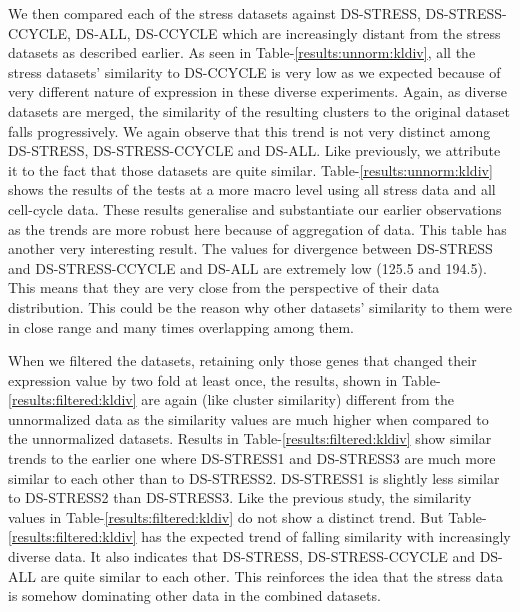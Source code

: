We then compared each of the stress datasets against DS-STRESS, DS-STRESS-CCYCLE, DS-ALL, DS-CCYCLE which are increasingly distant from the stress datasets as described earlier. As seen in Table-\ref{results:unnorm:kldiv}, all the stress datasets' similarity to DS-CCYCLE is very low as we expected because of very different nature of expression in these diverse experiments. Again, as diverse datasets are merged, the similarity of the resulting clusters to the original dataset falls progressively. We again observe that this trend is not very distinct among DS-STRESS, DS-STRESS-CCYCLE and DS-ALL. Like previously, we attribute it to the fact that those datasets are quite similar. Table-\ref{results:unnorm:kldiv} shows the results of the tests at a more macro level using all stress data and all cell-cycle data. These results generalise and substantiate our earlier observations as the trends are more robust here because of aggregation of data. This table has another very interesting result. The values for divergence between DS-STRESS and DS-STRESS-CCYCLE and DS-ALL are extremely low (125.5 and 194.5). This means that they are very close from the perspective of their data distribution. This could be the reason why other datasets' similarity to them were in close range and many times overlapping among them.

When we filtered the datasets, retaining only those genes that changed their expression value by two fold at least once, the results, shown in Table-\ref{results:filtered:kldiv} are again (like cluster similarity) different from the unnormalized data as the similarity values are much higher when compared to the unnormalized datasets. Results in Table-\ref{results:filtered:kldiv} show similar trends to the earlier one where DS-STRESS1 and DS-STRESS3 are much more similar to each other than to DS-STRESS2. DS-STRESS1 is slightly less similar to DS-STRESS2 than DS-STRESS3. Like the previous study, the similarity values in Table-\ref{results:filtered:kldiv} do not show a distinct trend. But Table-\ref{results:filtered:kldiv} has the expected trend of falling similarity with increasingly diverse data. It also indicates that DS-STRESS, DS-STRESS-CCYCLE and DS-ALL are quite similar to each other. This reinforces the idea that the stress data is somehow dominating other data in the combined datasets.

